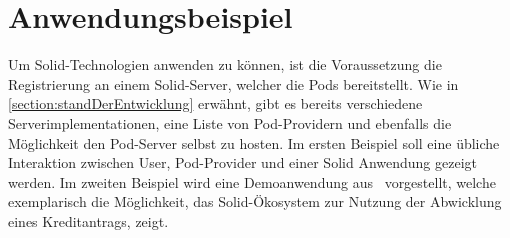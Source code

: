 \documentclass[acmtog]{acmart}
\begin{document}
\section{Anwendungsbeispiel} \label{section:anwendungsbeispiel}
Um Solid-Technologien anwenden zu können, ist die Voraussetzung die Registrierung an einem Solid-Server, welcher die Pods bereitstellt. Wie in \ref{section:standDerEntwicklung} erwähnt, gibt es bereits verschiedene Serverimplementationen, eine Liste von Pod-Providern und ebenfalls die Möglichkeit den Pod-Server selbst zu hosten. Im ersten Beispiel soll eine übliche Interaktion zwischen User, Pod-Provider und einer Solid Anwendung gezeigt werden. Im zweiten Beispiel wird eine Demoanwendung aus~\cite{DBLP:conf/i-semantics/HenselmannKSS0H22} vorgestellt, welche exemplarisch die Möglichkeit, das Solid-Ökosystem zur Nutzung der Abwicklung eines Kreditantrags, zeigt. 
\end{document}
